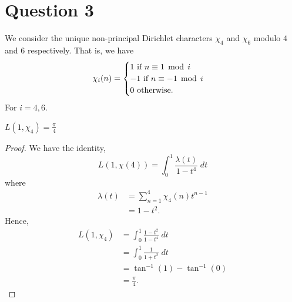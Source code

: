 \documentclass{unswmaths}
\begin{document}
    \section*{Question 3}
    We consider the unique non-principal  Dirichlet characters $\chi_4$ and $\chi_6$ modulo $4$ and $6$ respectively. That is, we have
    \begin{equation*}
        \chi_i(n) = \begin{cases}
            1\text{ if }n \equiv 1 \;\operatorname{mod}\;i\\
            -1\text{ if }n \equiv -1 \;\operatorname{mod}\;i\\
            0\text{ otherwise.}
        \end{cases}
    \end{equation*}
    For $i = 4,6$.
    \begin{theorem}
        $L(1,\chi_4) = \frac{\pi}{4}$
    \end{theorem}
    \begin{proof}
        We have the identity,
        \begin{equation*}
            L(1,\chi(4)) = \int_0^1 \frac{\lambda(t)}{1-t^4}\;dt
        \end{equation*}
        where
        \begin{align*}
            \lambda(t) &= \sum_{n=1}^4 \chi_4(n)t^{n-1}\\
            &= 1-t^2.
        \end{align*}
        Hence,
        \begin{align*}
            L(1,\chi_4) &= \int_0^1 \frac{1-t^2}{1-t^4}\;dt\\
            &= \int_0^1 \frac{1}{1+t^2}\;dt\\
            &= \tan^{-1}(1)-\tan^{-1}(0)\\
            &= \frac{\pi}{4}.
        \end{align*}        
    \end{proof}
    
\end{document}
